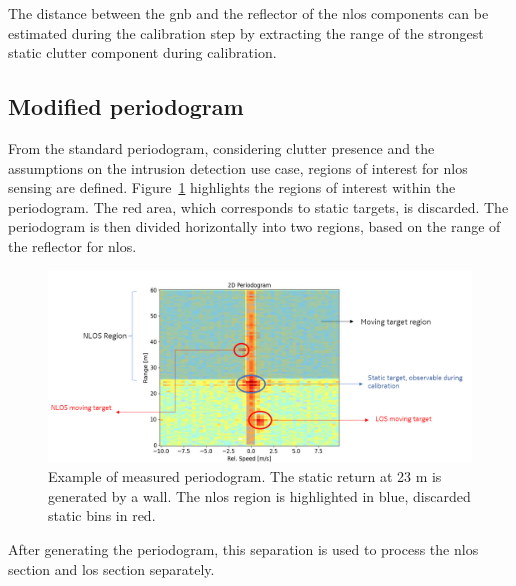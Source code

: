 			The distance between the \gls{gnb} and the reflector of the \gls{nlos} components can be estimated during the calibration step by extracting the range of the strongest static clutter component during calibration.

		\subsection{Modified periodogram}
			
			From the standard periodogram, considering clutter presence and the assumptions on the intrusion detection use case, regions of interest for \gls{nlos} sensing are defined.		
			Figure~\ref{fig:Rad_nlos_los_separation} highlights the regions of interest within the periodogram.
			The red area, which corresponds to static targets, is discarded. The periodogram is then divided horizontally into two regions, based on the range of the reflector for \gls{nlos}.
			\begin{figure}[t]
				\centering
				\includegraphics[width=1.1\textwidth]{Images/Test1/nlos-los-separation.png}
				\caption{\small Example of measured periodogram.
					The static return at 23 m is generated by a wall.
					The \gls{nlos} region is highlighted in blue, discarded static bins in red.}
				\label{fig:Rad_nlos_los_separation}
			\end{figure}
			After generating the periodogram, this separation is used to process the \gls{nlos} section and \gls{los} section separately.
		
